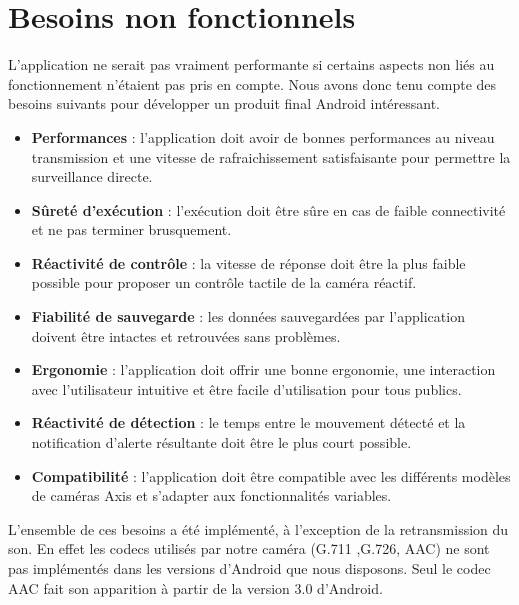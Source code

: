 \section{Besoins non fonctionnels}
L'application ne serait pas vraiment performante si certains aspects non liés au fonctionnement n'étaient pas pris en compte. Nous avons donc tenu compte des besoins suivants pour développer un produit final Android intéressant.
\newline
\begin{itemize}
  \item \textbf{Performances} : l'application doit avoir de bonnes performances au
  niveau transmission et une vitesse de rafraichissement satisfaisante pour permettre la surveillance directe.
  \item \textbf{Sûreté d'exécution} : l'exécution doit être sûre en cas de faible
  connectivité et ne pas terminer brusquement.
  \item \textbf{Réactivité de contrôle} : la vitesse de réponse doit être la plus
  faible possible pour proposer un contrôle tactile de la caméra réactif.
  \item \textbf{Fiabilité de sauvegarde} : les données sauvegardées par
  l'application doivent être intactes et retrouvées sans problèmes.
  \item \textbf{Ergonomie} : l'application doit offrir une bonne ergonomie, une
  interaction avec l'utilisateur intuitive et être facile d'utilisation pour tous publics.
  \item \textbf{Réactivité de détection} : le temps entre le mouvement détecté et
  la notification d'alerte résultante doit être le plus court possible.
  \item \textbf{Compatibilité} : l'application doit être compatible avec les
  différents modèles de caméras Axis et s'adapter aux fonctionnalités variables.
  \newline
\end{itemize}

L'ensemble de ces besoins a été implémenté, à l'exception de la
retransmission du son. En effet les codecs utilisés par notre caméra (G.711
,G.726, AAC) ne sont pas implémentés dans les versions d'Android que nous disposons. Seul le codec AAC fait son
apparition à partir de la version 3.0 d'Android.
\clearpage